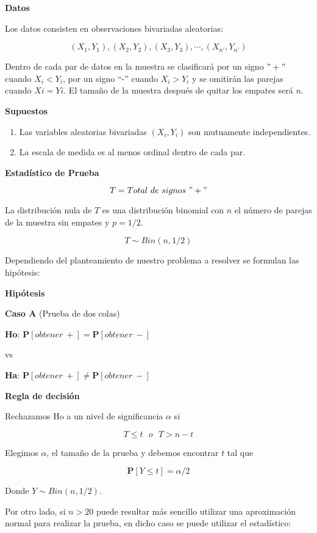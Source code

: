 \documentclass[a4paper,oneside,openany]{book}
\begin{document}
\textbf{Datos}

Los datos consisten en observaciones bivariadas aleatorias:

\[(X_{1},Y_{1}),(X_{2},Y_{2}),(X_{3},Y_{3}),\cdots,(X_{n'},Y_{n'})\]

Dentro de cada par de datos en la muestra se clasificará por un signo
\("+"\) cuando \(X_{i} < Y_{i}\), por un signo ``-'' cuando
\(X_{i} > Y_{i}\) y se omitirán las parejas cuando \(Xi = Yi\). El
tamaño de la muestra después de quitar los empates será \(n\).

\textbf{Supuestos}

\begin{enumerate}
\def\labelenumi{\arabic{enumi})}
\item
  Las variables aleatorias bivariadas \((X_{i},Y_{i})\) son mutuamente
  independientes.
\item
  La escala de medida es al menos ordinal dentro de cada par.
\end{enumerate}

\textbf{Estadístico de Prueba}

\[T=Total\ de\ signos\ "+"\]

La distribución nula de \(T\) es una distribución binomial con \(n\) el
número de parejas de la muestra sin empates y \(p=1/2\).

\[T\sim Bin(n,1/2)\]

Dependiendo del planteamiento de nuestro problema a resolver se formulan
las hipótesis:

\textbf{Hipótesis}

\textbf{Caso A} (Prueba de dos colas)

\textbf{Ho}: \(\mathbf{P}[obtener\ +]= \mathbf{P}[obtener\ -]\)

vs

\textbf{Ha}: \(\mathbf{P}[obtener\ +] \neq \mathbf{P}[obtener\ -]\)

\textbf{Regla de decisión}

Rechazamos Ho a un nivel de significancia \(\alpha\) si

\[T \leq t \ \ \  o \ \ \ T>n-t\]

Elegimos \(\alpha\), el tamaño de la prueba y debemos encontrar \(t\)
tal que

\[\mathbf{P}[Y \leq t]=\alpha/2\]

Donde \(Y \sim Bin (n,1/2)\).

Por otro lado, si \(n>20\) puede resultar más sencillo utilizar una
aproximación normal para realizar la prueba, en dicho caso se puede
utilizar el estadístico:
\end{document}
